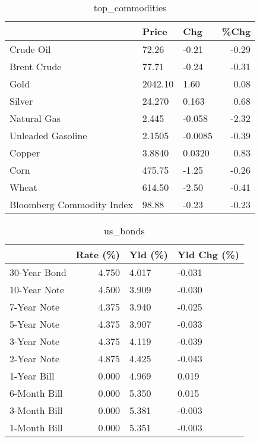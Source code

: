\documentclass{article}%
\begin{document}
\begin{table}[htbp]%
\caption{top\_commodities}%
\centering%
\begin{adjustbox}{width=1\textwidth}%
\begin{tabular}{lllr}
\toprule
                          &   Price &     Chg &  \%Chg \\
\midrule
               Crude Oil  &   72.26 &   -0.21 & -0.29 \\
             Brent Crude  &   77.71 &   -0.24 & -0.31 \\
                    Gold  & 2042.10 &    1.60 &  0.08 \\
                  Silver  &  24.270 &   0.163 &  0.68 \\
             Natural Gas  &   2.445 &  -0.058 & -2.32 \\
       Unleaded Gasoline  &  2.1505 & -0.0085 & -0.39 \\
                  Copper  &  3.8840 &  0.0320 &  0.83 \\
                    Corn  &  475.75 &   -1.25 & -0.26 \\
                   Wheat  &  614.50 &   -2.50 & -0.41 \\
Bloomberg Commodity Index &   98.88 &   -0.23 & -0.23 \\
\bottomrule
\end{tabular}
%
\end{adjustbox}%
\end{table}

%


\begin{table}[htbp]%
\caption{us\_bonds}%
\centering%
\begin{adjustbox}{width=1\textwidth}%
\begin{tabular}{lrll}
\toprule
             &  Rate (\%) & Yld (\%) & Yld Chg (\%) \\
\midrule
30-Year Bond &     4.750 &   4.017 &      -0.031 \\
10-Year Note &     4.500 &   3.909 &      -0.030 \\
 7-Year Note &     4.375 &   3.940 &      -0.025 \\
 5-Year Note &     4.375 &   3.907 &      -0.033 \\
 3-Year Note &     4.375 &   4.119 &      -0.039 \\
 2-Year Note &     4.875 &   4.425 &      -0.043 \\
 1-Year Bill &     0.000 &   4.969 &       0.019 \\
6-Month Bill &     0.000 &   5.350 &       0.015 \\
3-Month Bill &     0.000 &   5.381 &      -0.003 \\
1-Month Bill &     0.000 &   5.351 &      -0.003 \\
\bottomrule
\end{tabular}
%
\end{adjustbox}%
\end{table}
\end{document}
